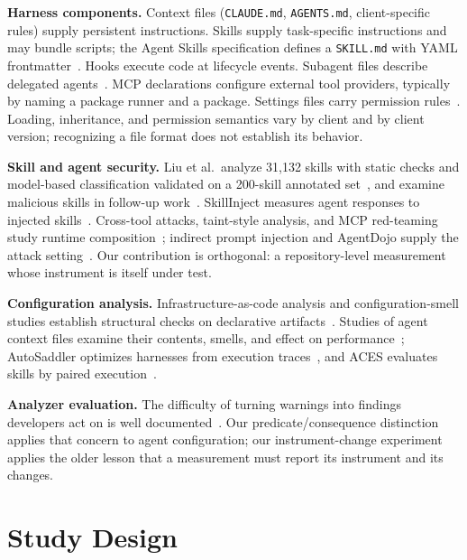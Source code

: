 \documentclass[10pt,conference]{IEEEtran}
\begin{document}
\textbf{Harness components.} Context files (\texttt{CLAUDE.md}, \texttt{AGENTS.md}, client-specific rules) supply persistent instructions. Skills supply task-specific instructions and may bundle scripts; the Agent Skills specification defines a \texttt{SKILL.md} with YAML frontmatter~\cite{agentskills_spec}. Hooks execute code at lifecycle events. Subagent files describe delegated agents~\cite{claude_subagents,github_agents}. MCP declarations configure external tool providers, typically by naming a package runner and a package. Settings files carry permission rules~\cite{claude_permissions,claude_settings}. Loading, inheritance, and permission semantics vary by client and by client version; recognizing a file format does not establish its behavior.

\textbf{Skill and agent security.} Liu et al.\ analyze 31,132 skills with static checks and model-based classification validated on a 200-skill annotated set~\cite{liu2026skills}, and examine malicious skills in follow-up work~\cite{liu2026malicious}. SkillInject measures agent responses to injected skills~\cite{schmotz2026skillinject}. Cross-tool attacks, taint-style analysis, and MCP red-teaming study runtime composition~\cite{li2026dissonances,liu2025taint,he2026redteam}; indirect prompt injection and AgentDojo supply the attack setting~\cite{greshake2023injection,debenedetti2024agentdojo}. Our contribution is orthogonal: a repository-level measurement whose instrument is itself under test.

\textbf{Configuration analysis.} Infrastructure-as-code analysis and configuration-smell studies establish structural checks on declarative artifacts~\cite{chiari2022iac,sharma2016smell,rahman2019sins}. Studies of agent context files examine their contents, smells, and effect on performance~\cite{santos2026agentsmd,chatlatanagulchai2025readmes,gloaguen2026agentsmd,lulla2026agentsmd}; AutoSaddler optimizes harnesses from execution traces~\cite{park2026autosaddler}, and ACES evaluates skills by paired execution~\cite{kevin2026aces}.

\textbf{Analyzer evaluation.} The difficulty of turning warnings into findings developers act on is well documented~\cite{johnson2013why,bessey2010billion,kremenek2004correlation,austin2011one}. Our predicate/consequence distinction applies that concern to agent configuration; our instrument-change experiment applies the older lesson that a measurement must report its instrument and its changes.

\section{Study Design}
\label{sec:design}
\end{document}
